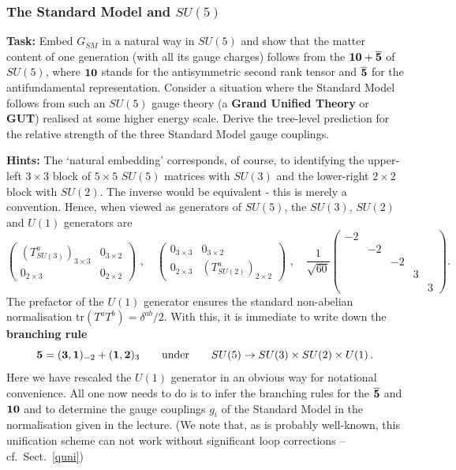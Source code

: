 \documentclass[12pt]{article}
\newcommand{\be}{\begin{equation}}
\newcommand{\ee}{\end{equation}}
\newcommand{\ol}{\overline}
\numberwithin{equation}{section}
\begin{document}
\subsubsection{The Standard Model and $SU(5)$}
\label{smsu5}

{\bf Task:} Embed $G_{SM}$ in a natural way in $SU(5)$ and show that the matter content of one generation (with all its gauge charges) follows from the ${\bf 10}+\ol{\bf 5}$ of $SU(5)$, where ${\bf 10}$ stands for the antisymmetric second rank tensor and $\ol{\bf 5}$ for the antifundamental representation. Consider a situation where the Standard Model follows from such an $SU(5)$ gauge theory (a {\bf Grand Unified Theory} or {\bf GUT}) realised at some higher energy scale. Derive the tree-level prediction for the relative strength of the three Standard Model gauge couplings.

\noindent
{\bf Hints:} The `natural embedding' corresponds, of course, to identifying the upper-left $3\times 3$ block of $5\times 5$ $SU(5)$ matrices with $SU(3)$ and the lower-right $2\times 2$ block with $SU(2)$. The inverse would be equivalent - this is merely a convention. Hence, when viewed as generators of $SU(5)$, the $SU(3)$, $SU(2)$ and $U(1)$ generators are
\be
\left(\begin{array}{cc}
\left(T_{SU(3)}^a\right)_{3\times 3} & 0_{3\times 2}\\
0_{2\times 3} & 0_{2\times 2}
\end{array}\right)\,\,,\quad
\left(\begin{array}{cc}
0_{3\times 3} & 0_{3\times 2}\\
0_{2\times 3} & \left(T_{SU(2)}^a\right)_{2\times 2} 
\end{array}\right)\,\,,\quad
\frac{1}{\sqrt{60}}
\left(\begin{array}{ccccc}
-2&&&&\\
&-2&&&\\
&&-2&&\\
&&&3&\\
&&&&3
\end{array}\right).
\ee
The prefactor of the $U(1)$ generator ensures the standard non-abelian normalisation tr$(T^aT^b)=\delta^{ab}/2$. With this, it is immediate to write down the {\bf branching rule}
\be
{\bf 5}=({\bf 3},{\bf 1})_{-2}+({\bf 1},{\bf 2})_3\qquad\mbox{under}\qquad SU(5)\to SU(3)\times SU(2)\times U(1)\,.
\ee
Here we have rescaled the $U(1)$ generator in an obvious way for notational convenience. All one now needs to do is to infer the branching rules for the $\ol{\bf 5}$ and ${\bf 10}$ and to determine the gauge couplings $g_i$ of the Standard Model in the normalisation given in the lecture. (We note that, as is probably well-known, this unification scheme can not work without significant loop corrections -- cf.~Sect.~\ref{quni})
\end{document}
